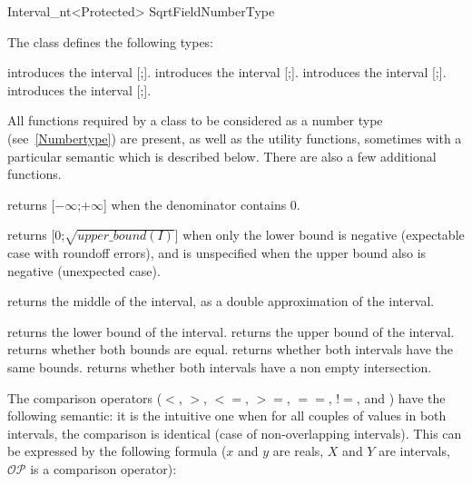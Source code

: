 \begin{ccRefClass}{Interval_nt<Protected>}
\ccIsModel
SqrtFieldNumberType

\ccTypes
The class  defines the following types:
\ccThreeToTwo
{}
\ccGlue
{}


\ccCreation

{introduces the interval [;].}
\ccGlue
{}
{introduces the interval [;].}
\ccGlue
{}
{introduces the interval [;].}
\ccGlue
{}
{introduces the interval [;].}


\ccOperations
{}

All functions required by a class to be considered as a {\cgal} number type
(see~\ref{Numbertype}) are present, as well as the utility functions,
sometimes with a particular semantic which is described below.  There are also
a few additional functions.


 {returns
[$-\infty$;$+\infty$] when the denominator contains 0.}

 {returns
[0;$\sqrt{upper\_bound(I)}$] when only the lower bound is negative (expectable
case with roundoff errors), and is unspecified when the upper bound also is
negative (unexpected case).}

 {returns the
middle of the interval, as a double approximation of the interval.}

 {returns the lower bound of the interval.}
 {returns the upper bound of the interval.}
 {returns whether both bounds are equal.}
 {returns whether both intervals have
the same bounds.}
 {returns whether both intervals
have a non empty intersection.}

The comparison operators ($<$, $>$, $<=$, $>=$, $==$, $!=$, 
and ) have the following semantic: it is the intuitive
one when for all couples of values in both intervals, the comparison
is identical (case of non-overlapping intervals).  This can be expressed
by the following formula ($x$ and $y$ are reals, $X$ and $Y$ are
intervals, $\mathcal{OP}$ is a comparison operator):


\end{ccRefClass}
